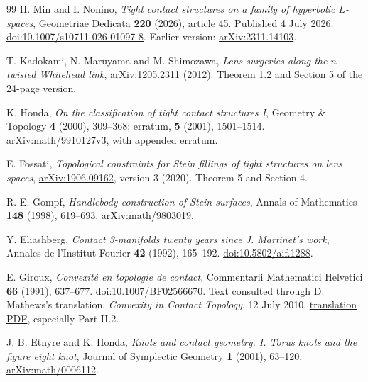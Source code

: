 \documentclass[12pt]{amsart}
\theoremstyle{definition}
\theoremstyle{remark}
\numberwithin{equation}{section}
\theoremstyle{definition}
\begin{document}
\renewcommand{\refname}{参考文献}
\begin{thebibliography}{99}
H. Min and I. Nonino, \emph{Tight contact structures on a family of hyperbolic $L$-spaces}, Geometriae Dedicata \textbf{220} (2026), article 45. Published 4 July 2026. \href{https://doi.org/10.1007/s10711-026-01097-8}{doi:10.1007/s10711-026-01097-8}. Earlier version: \href{https://arxiv.org/abs/2311.14103}{arXiv:2311.14103}.

T. Kadokami, N. Maruyama and M. Shimozawa, \emph{Lens surgeries along the $n$-twisted Whitehead link}, \href{https://arxiv.org/abs/1205.2311}{arXiv:1205.2311} (2012). Theorem 1.2 and Section 5 of the 24-page version.

K. Honda, \emph{On the classification of tight contact structures I}, Geometry \& Topology \textbf{4} (2000), 309--368; erratum, \textbf{5} (2001), 1501--1514. \href{https://arxiv.org/abs/math/9910127}{arXiv:math/9910127v3}, with appended erratum.

E. Fossati, \emph{Topological constraints for Stein fillings of tight structures on lens spaces}, \href{https://arxiv.org/abs/1906.09162}{arXiv:1906.09162}, version 3 (2020). Theorem 5 and Section 4.

R. E. Gompf, \emph{Handlebody construction of Stein surfaces}, Annals of Mathematics \textbf{148} (1998), 619--693. \href{https://arxiv.org/abs/math/9803019}{arXiv:math/9803019}.

Y. Eliashberg, \emph{Contact 3-manifolds twenty years since J. Martinet's work}, Annales de l'Institut Fourier \textbf{42} (1992), 165--192. \href{https://doi.org/10.5802/aif.1288}{doi:10.5802/aif.1288}.

E. Giroux, \emph{Convexit\'e en topologie de contact}, Commentarii Mathematici Helvetici \textbf{66} (1991), 637--677. \href{https://doi.org/10.1007/BF02566670}{doi:10.1007/BF02566670}. Text consulted through D. Mathews's translation, \emph{Convexity in Contact Topology}, 12 July 2010, \href{https://few.vu.nl/~pasquott/Giroux-convexity.pdf}{translation PDF}, especially Part II.2.

J. B. Etnyre and K. Honda, \emph{Knots and contact geometry. I. Torus knots and the figure eight knot}, Journal of Symplectic Geometry \textbf{1} (2001), 63--120. \href{https://arxiv.org/abs/math/0006112}{arXiv:math/0006112}.


\end{thebibliography}
\end{document}
